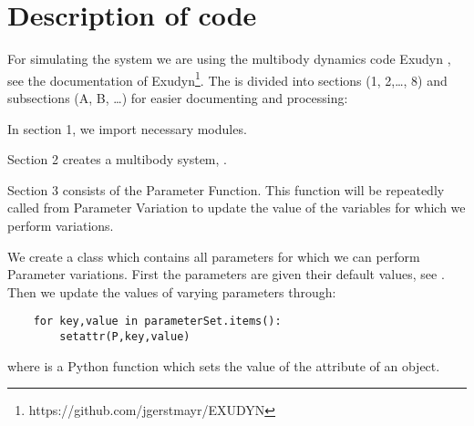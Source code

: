\section{Description of code}
For simulating the system we are using the multibody dynamics code Exudyn \cite{Gerstmayr2022}, see the documentation of Exudyn\footnote{https://github.com/jgerstmayr/EXUDYN}.
%
The  is divided into sections (1, 2,…, 8) and subsections (A, B, …) for easier documenting and processing: %
\bi 
\item{In section 1, we import necessary modules.}
\item{Section 2 creates a multibody system, .}
\item{Section 3 consists of the Parameter Function. This function will be repeatedly called from Parameter Variation to update the value of the variables for which we perform variations.} 
\bi
\item{
We create a class  which contains all parameters for which we can perform Parameter variations. First the parameters are given their default values, see . Then we update the values of varying parameters through:
\pythonstyle
\begin{lstlisting}
	for key,value in parameterSet.items():
		setattr(P,key,value)
\end{lstlisting}		
where  is a Python function which sets the value of the attribute of an object.}
%

